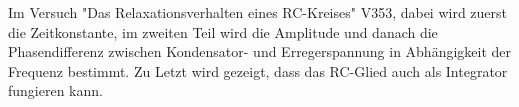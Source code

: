 Im Versuch "Das Relaxationsverhalten eines RC-Kreises" V353, dabei wird zuerst die Zeitkonstante, im zweiten Teil wird die Amplitude und danach die Phasendifferenz zwischen Kondensator- und Erregerspannung in Abhängigkeit der
Frequenz bestimmt.
Zu Letzt wird gezeigt, dass das RC-Glied auch als Integrator fungieren kann.
